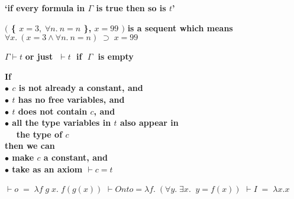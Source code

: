 \vskip7mm
\vskip5mm
\bspindent\Large\bf
{`if every formula in $\Gamma$ is true then
so is $t$'}
\espindent

\vskip 5mm
\bspindent\LARGE{\bf
$($ \{ $x=3,\;  \forall n.\: n=n$ \}, $x=99$ $)$
}\espindent
\vskip 5mm
\bpindent\LARGE\bf is a sequent which means\epindent
\vskip 5mm
\bspindent\LARGE{\bf
\( \forall x.\: (x=3 \wedge \forall n.\:n=n) \; \supset \; x=99 \)}
\espindent




\vskip7mm
\vskip 5mm
\bspindent\LARGE
\( \Gamma \vdash t \)
\espindent
\vskip 5mm
\bpindent\LARGE
{\bf or just \( \; \vdash t \; \) if $\; \Gamma \; $ is empty}
\epindent
\vskip7mm



\vskip7mm

\vskip5mm
\bspindent\Large\bf
{\Large\bf If}\\[2mm]
\mbox{}\hskip10mm $\bullet$ $c$ is not already a constant, and\\
\mbox{}\hskip10mm  $\bullet$ $t$ has no free variables, and\\
\mbox{}\hskip10mm  $\bullet$ $t$ does not contain $c$, and\\
\mbox{}\hskip10mm  $\bullet$ all the type variables in $t$ also appear in\\
\mbox{}\hskip10mm  $\phantom\bullet$\ the type of $c$ \\[2mm]
{\Large\bf then we can}\\[2mm]
\mbox{}\hskip10mm  $\bullet$ make $c$ a constant, and \\
\mbox{}\hskip10mm  $\bullet$ take as an axiom \(\vdash c = t\)
\espindent
\vskip5mm


\vskip5mm


\vskip 5mm
\bspindent\LARGE{
\(\vdash o \; = \; \lambda f \; g\; x. \; f(g(x))\)
\vskip 5mm
\(\vdash Onto = \lambda f. \; (\forall y. \; \exists x. \;\; y = f(x))\)
\vskip 5mm
\(\vdash I \; = \; \lambda x. x\)}
\espindent

